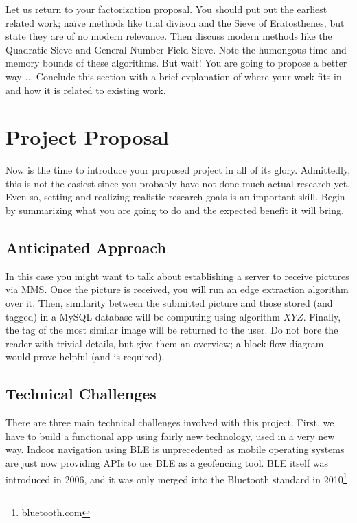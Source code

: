 \documentclass{sig-alternate}
\begin{document}
Let us return to your factorization proposal. You should put out the
earliest related work; na\"{i}ve methods like trial divison and the
Sieve of Eratosthenes, but state they are of no modern relevance. Then
discuss modern methods like the Quadratic Sieve and General Number
Field Sieve. Note the humongous time and memory bounds of these
algorithms. But wait! You are going to propose a better way $\ldots$
Conclude this section with a brief explanation of where your work fits
in and how it is related to existing work.

\section{Project Proposal}
\label{sec:project_proposal}
Now is the time to introduce your proposed project in all of its
glory. Admittedly, this is not the easiest since you probably have not
done much actual research yet. Even so, setting and realizing
realistic research goals is an important skill. Begin by summarizing
what you are going to do and the expected benefit it will bring.

\subsection{Anticipated Approach}
\label{subsec:approach}
In this case you might want to talk about establishing a server to
receive pictures via MMS. Once the picture is received, you will run
an edge extraction algorithm over it. Then, similarity between the
submitted picture and those stored (and tagged) in a MySQL database
will be computing using algorithm $XYZ$. Finally, the tag of the most
similar image will be returned to the user. Do not bore the reader
with trivial details, but give them an overview; a block-flow diagram
would prove helpful (and is required).

\subsection{Technical Challenges}
\label{subsec:tech_challenges}
There are three main technical challenges involved with this project.
First, we have to build a functional app using fairly new technology, 
used in a very new way. Indoor navigation using BLE is unprecedented 
as mobile operating systems are just now providing APIs to use BLE 
as a geofencing tool. BLE itself was introduced in 2006, and it was
only merged into the Bluetooth standard in 2010\footnote{bluetooth.com}
\end{document}
